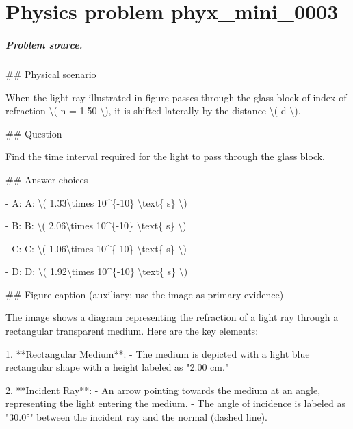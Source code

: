 
\chapter{Physics problem phyx\_mini\_0003}
\label{ch:PhyXMiniProblems_problem_phyx_mini_0003}

\paragraph{Problem source.}
\#\# Physical scenario

When the light ray illustrated in figure passes through the glass block of index of refraction \textbackslash{}( n = 1.50 \textbackslash{}), it is shifted laterally by the distance \textbackslash{}( d \textbackslash{}).

\#\# Question

Find the time interval required for the light to pass through the glass block.

\#\# Answer choices

- A: A: \textbackslash{}( 1.33\textbackslash{}times 10\textasciicircum{}\{-10\} \textbackslash{}text\{ s\} \textbackslash{})

- B: B: \textbackslash{}( 2.06\textbackslash{}times 10\textasciicircum{}\{-10\} \textbackslash{}text\{ s\} \textbackslash{})

- C: C: \textbackslash{}( 1.06\textbackslash{}times 10\textasciicircum{}\{-10\} \textbackslash{}text\{ s\} \textbackslash{})

- D: D: \textbackslash{}( 1.92\textbackslash{}times 10\textasciicircum{}\{-10\} \textbackslash{}text\{ s\} \textbackslash{})

\#\# Figure caption (auxiliary; use the image as primary evidence)

The image shows a diagram representing the refraction of a light ray through a rectangular transparent medium. Here are the key elements:

1. **Rectangular Medium**: 
   - The medium is depicted with a light blue rectangular shape with a height labeled as "2.00 cm."

2. **Incident Ray**: 
   - An arrow pointing towards the medium at an angle, representing the light entering the medium.
   - The angle of incidence is labeled as "30.0°" between the incident ray and the normal (dashed line).

